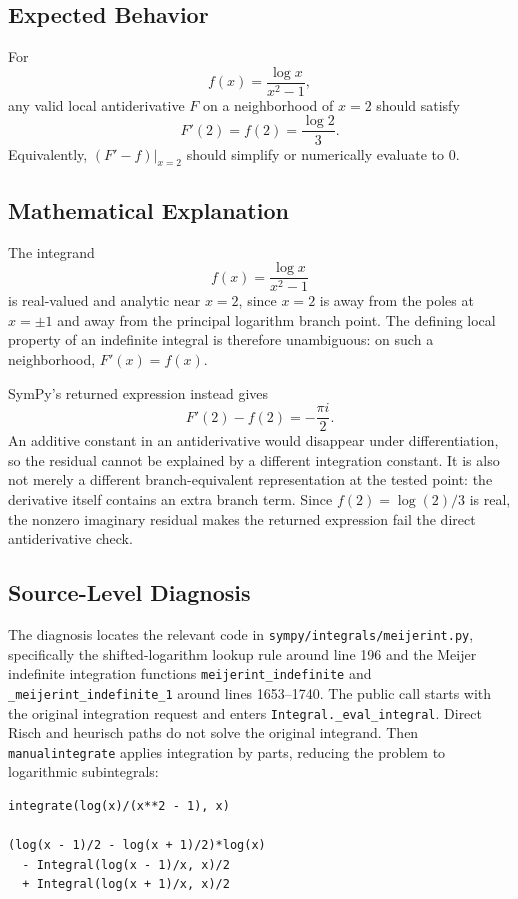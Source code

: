 \documentclass[11pt]{article}
\begin{document}
\subsection{Expected Behavior}

For
\[
f(x)=\frac{\log x}{x^2-1},
\]
any valid local antiderivative \(F\) on a neighborhood of \(x=2\) should satisfy
\[
F'(2)=f(2)=\frac{\log 2}{3}.
\]
Equivalently, \((F'-f)\vert_{x=2}\) should simplify or numerically evaluate to \(0\).

\subsection{Mathematical Explanation}

The integrand
\[
f(x)=\frac{\log x}{x^2-1}
\]
is real-valued and analytic near \(x=2\), since \(x=2\) is away from the poles at \(x=\pm1\) and away from the principal logarithm branch point. The defining local property of an indefinite integral is therefore unambiguous: on such a neighborhood, \(F'(x)=f(x)\).

SymPy's returned expression instead gives
\[
F'(2)-f(2)=-\frac{\pi i}{2}.
\]
An additive constant in an antiderivative would disappear under differentiation, so the residual cannot be explained by a different integration constant. It is also not merely a different branch-equivalent representation at the tested point: the derivative itself contains an extra branch term. Since \(f(2)=\log(2)/3\) is real, the nonzero imaginary residual makes the returned expression fail the direct antiderivative check.

\subsection{Source-Level Diagnosis}

The diagnosis locates the relevant code in \nolinkurl{sympy/integrals/meijerint.py}, specifically the shifted-logarithm lookup rule around line 196 and the Meijer indefinite integration functions \nolinkurl{meijerint_indefinite} and \nolinkurl{_meijerint_indefinite_1} around lines 1653--1740. The public call starts with the original integration request and enters \nolinkurl{Integral._eval_integral}. Direct Risch and heurisch paths do not solve the original integrand. Then \nolinkurl{manualintegrate} applies integration by parts, reducing the problem to logarithmic subintegrals:

\begin{lstlisting}[style=bugpython]
integrate(log(x)/(x**2 - 1), x)

(log(x - 1)/2 - log(x + 1)/2)*log(x)
  - Integral(log(x - 1)/x, x)/2
  + Integral(log(x + 1)/x, x)/2
\end{lstlisting}
\end{document}
